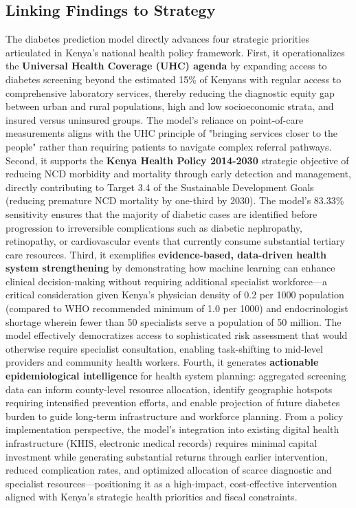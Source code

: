 \documentclass[12pt]{article}
\begin{document}
\subsection{Linking Findings to Strategy}

The diabetes prediction model directly advances four strategic priorities articulated in Kenya's national health policy framework. First, it operationalizes the \textbf{Universal Health Coverage (UHC) agenda} by expanding access to diabetes screening beyond the estimated 15\% of Kenyans with regular access to comprehensive laboratory services, thereby reducing the diagnostic equity gap between urban and rural populations, high and low socioeconomic strata, and insured versus uninsured groups. The model's reliance on point-of-care measurements aligns with the UHC principle of "bringing services closer to the people" rather than requiring patients to navigate complex referral pathways. Second, it supports the \textbf{Kenya Health Policy 2014-2030} strategic objective of reducing NCD morbidity and mortality through early detection and management, directly contributing to Target 3.4 of the Sustainable Development Goals (reducing premature NCD mortality by one-third by 2030). The model's 83.33\% sensitivity ensures that the majority of diabetic cases are identified before progression to irreversible complications such as diabetic nephropathy, retinopathy, or cardiovascular events that currently consume substantial tertiary care resources. Third, it exemplifies \textbf{evidence-based, data-driven health system strengthening} by demonstrating how machine learning can enhance clinical decision-making without requiring additional specialist workforce—a critical consideration given Kenya's physician density of 0.2 per 1000 population (compared to WHO recommended minimum of 1.0 per 1000) and endocrinologist shortage wherein fewer than 50 specialists serve a population of 50 million. The model effectively democratizes access to sophisticated risk assessment that would otherwise require specialist consultation, enabling task-shifting to mid-level providers and community health workers. Fourth, it generates \textbf{actionable epidemiological intelligence} for health system planning: aggregated screening data can inform county-level resource allocation, identify geographic hotspots requiring intensified prevention efforts, and enable projection of future diabetes burden to guide long-term infrastructure and workforce planning. From a policy implementation perspective, the model's integration into existing digital health infrastructure (KHIS, electronic medical records) requires minimal capital investment while generating substantial returns through earlier intervention, reduced complication rates, and optimized allocation of scarce diagnostic and specialist resources—positioning it as a high-impact, cost-effective intervention aligned with Kenya's strategic health priorities and fiscal constraints.
\newpage
\pagestyle{plain}


\end{document}
